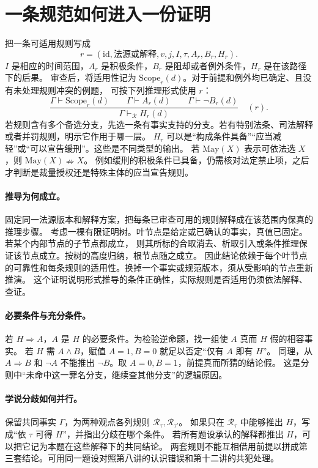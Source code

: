 \section{一条规范如何进入一份证明}

把一条可适用规则写成
\[
 r=(\mathrm{id},\text{法源或解释},v,j,I,\tau,
       A_r,B_r,H_r).
\]
$I$ 是相应的时间范围，$A_r$ 是积极条件，$B_r$ 是阻却或者例外条件，$H_r$ 是在该路径下的后果。
审查后，将适用性记为 $\mathrm{Scope}_r(d)$。对于前提和例外均已确定、且没有未处理规则冲突的例题，
可按下列推理形式使用 $r$：
\[
\frac{
 \Gamma\vdash \mathrm{Scope}_r(d)
 \qquad \Gamma\vdash A_r(d)
 \qquad \Gamma\vdash \neg B_r(d)
}{
 \Gamma\vdash_{\mathcal R} H_r(d)
}\quad(r).
\]
若规则含有多个备选分支，先选一条有事实支持的分支。若有特别法条、司法解释或者并罚规则，明示它作用于哪一层。
$H_r$ 可以是“构成条件具备”“应当减轻”或“可以宣告缓刑”。这些是不同类型的输出。
若 $\mathrm{May}(X)$ 表示可依法选 $X$，则 $\mathrm{May}(X)\nRightarrow X$。
例如缓刑的积极条件已具备，仍需核对法定禁止项，之后才判断是裁量授权还是特殊主体的应当宣告规则。

\paragraph{推导为何成立。}
固定同一法源版本和解释方案，把每条已审查可用的规则解释成在该范围内保真的推理步骤。
考虑一棵有限证明树。叶节点是给定或已确认的事实，真值已固定。若某个内部节点的子节点都成立，
则其所标的合取消去、析取引入或条件推理保证该节点成立。按树的高度归纳，根节点随之成立。
因此结论依赖于每个叶节点的可靠性和每条规则的适用性。换掉一个事实或规范版本，须从受影响的节点重新推演。
这个证明说明形式推导的条件正确性，实际规则是否适用仍须依法解释、查证。

\paragraph{必要条件与充分条件。}
若 $H\Rightarrow A$，$A$ 是 $H$ 的必要条件。为检验逆命题，找一组使 $A$ 真而 $H$ 假的相容事实。
若 $H$ 需 $A\land B$，赋值 $A=1,B=0$ 就足以否定“仅有 $A$ 即有 $H$”。
同理，从 $A\Rightarrow B$ 和 $\neg A$ 不能推出 $\neg B$。取 $A=0,B=1$，前提真而所猜的结论假。
这是分则中“未命中这一罪名分支，继续查其他分支”的逻辑原因。

\paragraph{学说分歧如何并行。}
保留共同事实 $\Gamma$，为两种观点各列规则 $\mathcal R_\tau,\mathcal R_{\tau'}$。
如果只在 $\mathcal R_\tau$ 中能够推出 $H$，写成“依 $\tau$ 可得 $H$”，并指出分歧在哪个条件。
若所有题设承认的解释都推出 $H$，可以把它记为本题在这些解释下的共同结论。
两套规则不能互相借用前提以拼成第三套结论。可用同一题设对照第八讲的认识错误和第十二讲的共犯处理。

